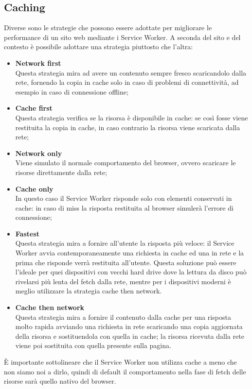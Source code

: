 \documentclass[11pt ,a4paper , twoside , openright ]{article}
\begin{document}
\subsection{Caching}
Diverse sono le strategie che possono essere adottate per migliorare le performance di un sito web mediante i Service Worker. A seconda del sito e del contesto è possibile adottare una strategia piuttosto che l’altra:
\begin{itemize}
	\item \textbf{Network first} \\
	Questa strategia mira ad avere un contenuto sempre fresco scaricandolo dalla rete, fornendo la copia in cache solo in caso di problemi di connettività, ad esempio in caso di connessione offline;
	\item \textbf{Cache first} \\
	Questa strategia verifica se la risorsa è disponibile in cache: se così fosse viene restituita la copia in cache, in caso contrario la risorsa viene scaricata dalla rete;
	\item \textbf{Network only} \\
	Viene simulato il normale comportamento del browser, ovvero scaricare le risorse direttamente dalla rete;
	\item \textbf{Cache only} \\
	In questo caso il Service Worker risponde solo con elementi conservati in cache: in caso di miss la risposta restituita al browser simulerà l’errore di connessione;
	\item \textbf{Fastest} \\
	Questa strategia mira a fornire all’utente la risposta più veloce: il Service Worker avvia contemporaneamente una richiesta in cache ed una in rete e la prima che risponde verrà restituita all’utente.
	Questa soluzione può essere l’ideale per quei dispositivi con vecchi hard drive dove la lettura da disco può  rivelarsi più lenta del fetch dalla rete, mentre per i dispositivi moderni è meglio utilizzare la strategia cache then network.
	\item \textbf{Cache then network} \\
	Questa strategia mira a fornire il contenuto dalla cache per una risposta molto rapida avviando una richiesta in rete scaricando una copia aggiornata della risorsa e sostituendola con quella in cache; la risorsa ricevuta dalla rete viene poi sostituita con quella presente sulla pagina.
\end{itemize}
È importante sottolineare che il Service Worker non utilizza cache a meno che non siamo noi a dirlo, quindi di default il comportamento nella fase di fetch delle risorse sarà quello nativo del browser.
\end{document}
